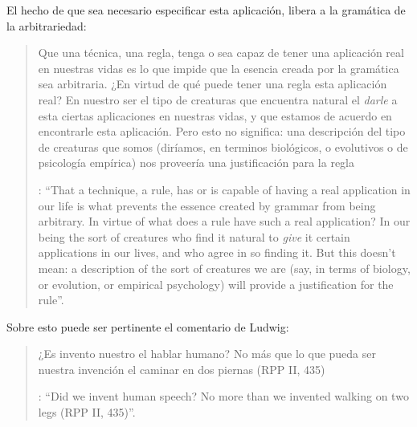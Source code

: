 El hecho de que sea necesario especificar esta aplicación, libera a la gramática de la arbitrariedad: \blockquote[{\Cite[220]{teichmann2008ans}}: \enquote{That a technique, a rule, has or is capable of having a real application in our life is what prevents the essence created by grammar from being arbitrary. In virtue of what does a rule have such a real application? In our being the sort of creatures who find it natural to \emph{give} it certain applications in our lives, and who agree in so finding it. But this doesn't mean: a description of the sort of creatures we are (say, in terms of biology, or evolution, or empirical psychology) will provide a justification for the rule}.]{Que una técnica, una regla, tenga o sea capaz de tener una aplicación real en nuestras vidas es lo que impide que la esencia creada por la gramática sea arbitraria. ¿En virtud de qué puede tener una regla esta aplicación real? En nuestro ser el tipo de creaturas que encuentra natural el \emph{darle} a esta ciertas aplicaciones en nuestras vidas, y que estamos de acuerdo en encontrarle esta aplicación. Pero esto no significa: una descripción del tipo de creaturas que somos (diríamos, en terminos biológicos, o evolutivos o de psicología empírica) nos proveería una justificación para la regla}. Sobre esto puede ser pertinente el comentario de Ludwig: \blockquote[{\Cite[114]{kerr1997theo}}: \enquote{Did we invent human speech? No more than we invented walking on two legs (RPP II, 435)}.]{¿Es invento nuestro el hablar humano? No más que lo que pueda ser nuestra invención el caminar en dos piernas (RPP II, 435)}.

